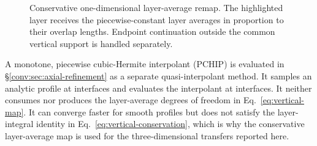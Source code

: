\begin{figure}[htbp]
\centering
{}
\caption{Conservative one-dimensional layer-average remap. The highlighted
\ROMS layer receives the piecewise-constant \MPAS layer averages in
proportion to their overlap lengths. Endpoint continuation outside the
common vertical support is handled separately.}
\label{fig:vertical-overlap-remap}
\end{figure}

A monotone, piecewise cubic-Hermite interpolant (PCHIP) is evaluated in
\S\ref{conv:sec:axial-refinement} as a separate quasi-interpolant method. It
samples an analytic profile at \MPAS interfaces and evaluates the
interpolant at \ROMS interfaces. It neither consumes nor produces the
layer-average degrees of freedom in Eq.~\eqref{eq:vertical-map}. It can
converge faster for smooth profiles but does not satisfy the layer-integral
identity in Eq.~\eqref{eq:vertical-conservation}, which is why the
conservative layer-average map is used for the three-dimensional transfers
reported here.

